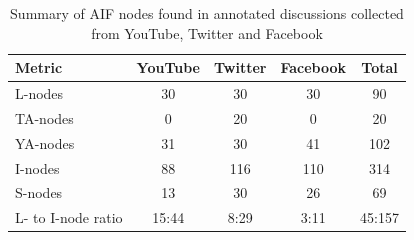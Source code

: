 \begin{table}
\centering
\caption{Summary of AIF nodes found in annotated discussions collected from YouTube, Twitter and Facebook}
\label{table:results:annotations}
\begin{tabular}{| l | c | c | c | c |}
\hline
\textbf{Metric} & \textbf{YouTube} & \textbf{Twitter} & \textbf{Facebook} & \textbf{Total} \\
\hline
L-nodes 			& 30	& 30 	& 30 	& 90\\
\hline
TA-nodes 			& 0		& 20 	& 0 	& 20\\
\hline
YA-nodes 			& 31	& 30	& 41 	& 102\\
\hline
I-nodes 			& 88	& 116	& 110 	& 314\\
\hline
S-nodes 			& 13	& 30    & 26 	& 69\\
\hline
L- to I-node ratio 	& 15:44	& 8:29  & 3:11	& 45:157\\
\hline
\end{tabular}
\end{table}

